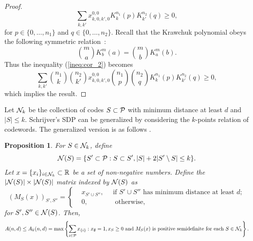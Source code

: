 \documentclass[final,onecolumn]{IEEEtran}
\newtheorem{propositionenv}[definitionenv]{Proposition}
\newenvironment{proposition}{\begin{propositionenv}\rm}{\end{propositionenv}}
\theoremstyle{definition}
\begin{document}
\begin{proof}
	\begin{equation}
		\label{ineq:cor_2}
		\sum_{k, k'} x_{k, 0, k', 0}^{0, 0} K_{k}^{n_{1}}(p) K_{k'}^{n_{2}}(q) \geq 0,
	\end{equation}
	for $p \in \{0, \dots, n_{1}\}$ and $q \in \{0, \dots, n_{2}\}$. Recall that the Krawchuk polynomial obeys the following symmetric relation~\cite{MS77}:
	\begin{equation*}
		\binom{m}{a}K_{b}^{m}(a) = \binom{m}{b}K_{a}^{m}(b).
	\end{equation*}
	Thus the inequality (\ref{ineq:cor_2}) becomes
	\begin{equation*}
		\sum_{k, k'} \binom{n_{1}}{k}\binom{n_{2}}{k'} x_{k, 0, k', 0}^{0, 0} \binom{n_{1}}{p} \binom{n_{2}}{q}K_{k}^{n_{1}}(p) K_{k'}^{n_{2}}(q) \geq 0,
	\end{equation*}
	which implies the result.
\end{proof}


Let ${\cal N}_{k}$ be the collection of codes $S \subset {\cal P}$ with minimum distance at least $d$ and $\lvert S \rvert \leq k$. Schrijver's SDP can be generalized by considering the $k$-points relation of codewords. The generalized version is as follows \cite{GMS12}.

\begin{proposition}\cite[Generalized  SDP bound]{GMS12}
    \label{pro:gen_sch_sdp}
    For $S \in {\cal N}_{k}$, define
    \begin{equation*}
        {\cal N}(S) = \{S' \subset {\cal P} : S \subset S', \lvert S \rvert + 2\lvert S' \setminus S \rvert \leq k \}.
    \end{equation*}
    Let $x = \{x_{i}\}_{i \in {\cal N}_{k}} \subset \mathbb{R}$ be a set of non-negative numbers. Define the $\lvert{\cal N}(S)\rvert \times \lvert{\cal N}(S)\rvert$ matrix indexed by ${\cal N}(S)$ as
    \begin{equation*}
    \label{gen_Sch}
        \left( M_{S}(x)\right)_{S', S''} = \left\{
        \begin{aligned}
            &x_{S' \cup S''}, \quad \text{ if } S' \cup S'' \text{ has minimum distance at least } d;\\
            &0,  \quad \quad \quad \quad \text{otherwise,}
        \end{aligned}\right.
    \end{equation*}
    for $S', S'' \in {\cal N}(S)$. Then,
    \begin{equation}
    \label{equ:k_sdp}
        A(n, d) \leq A_{k}(n, d) = {\rm max}\left\{\sum_{i \in {\cal P}}x_{\{i\}} : x_{\emptyset} = 1, x_{S} \geq 0 \text{ and } M_{S}(x) \text{ is positive semidefinite for each } S \in {\cal N}_{k} \right\}.
    \end{equation}
\end{proposition}
\end{document}
